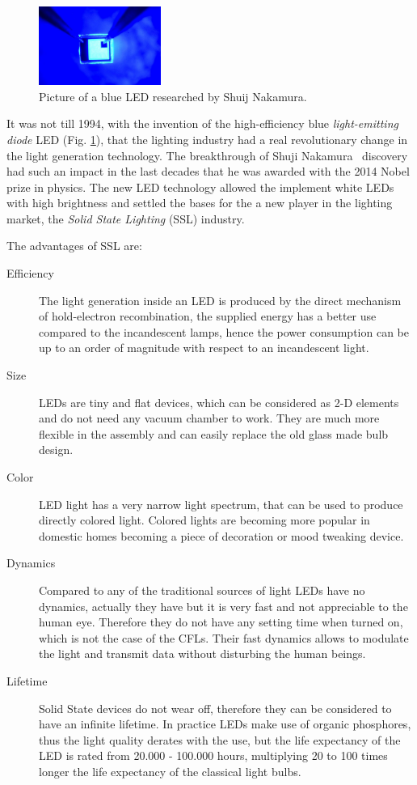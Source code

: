 \begin{figure}[!h]
\centering
\includegraphics[width=4cm]{./0_intro/img/10-7-14-nobel-prize-blue-led.jpg}
\caption{Picture of a blue LED researched by Shuij Nakamura.}
\label{fig:blue_LED}
\end{figure}

It was not till 1994, with the invention of the high-efficiency blue \emph{light-emitting diode} LED (Fig. \ref{fig:blue_LED}), that the lighting industry had a real revolutionary change in the light generation technology. The breakthrough of Shuji Nakamura~\cite{94Nakamura} discovery had such an impact in the last decades that he was awarded with the 2014 Nobel prize in physics. The new LED technology allowed the implement white LEDs with high brightness and settled the bases for the a new player in the lighting market, the \emph{Solid State Lighting} (SSL) industry.


The advantages of SSL are:
\begin{description}
  \item [Efficiency] The light generation inside an LED is produced by the direct mechanism of hold-electron recombination, the supplied energy has a better use compared to the incandescent lamps, hence the power consumption can be up to an order of magnitude with respect to an incandescent light.

  \item [Size] LEDs are tiny and flat devices, which can be considered as 2-D elements and do not need any vacuum chamber to work. They are much more flexible in the assembly and can easily replace the old glass made bulb design.

  \item [Color] LED light has a very narrow light spectrum, that can be used to produce directly colored light. Colored lights are becoming more popular in domestic homes becoming a piece of decoration or mood tweaking device.

  \item [Dynamics] Compared to any of the traditional sources of light LEDs have no dynamics, actually they have but it is very fast and not appreciable to the human eye. Therefore they do not have any setting time when turned on, which is not the case of the  CFLs. Their fast dynamics allows to modulate the light and transmit data without disturbing the human beings.

  \item [Lifetime] Solid State devices do not wear off, therefore they can be considered to have an infinite lifetime. In practice LEDs make use of organic phosphores, thus the light quality derates with the use, but the life expectancy of the LED is rated from 20.000 - 100.000 hours, multiplying 20 to 100 times longer the life expectancy of the classical light bulbs.
\end{description}

